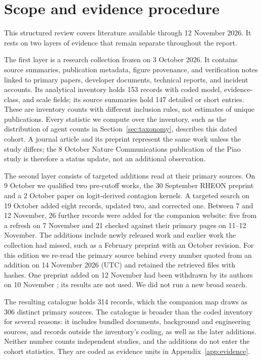 \section{Scope and evidence procedure}
\label{sec:methods}
This structured review covers literature available through 12 November 2026. It rests on two layers of evidence that remain separate throughout the report.

The first layer is a research collection frozen on 3 October 2026. It contains source summaries, publication metadata, figure provenance, and verification notes linked to primary papers, developer documents, technical reports, and incident accounts. Its analytical inventory holds 153 records with coded model, evidence-class, and scale fields; its source summaries hold 147 detailed or short entries. These are inventory counts with different inclusion rules, not estimates of unique publications. Every statistic we compute over the inventory, such as the distribution of agent counts in Section~\ref{sec:taxonomy}, describes this dated cohort. A journal article and its preprint represent the same work unless the study differs; the 8 October Nature Communications publication of the Piao study is therefore a status update, not an additional observation.

The second layer consists of targeted additions read at their primary sources. On 9 October we qualified two pre-cutoff works, the 30 September RHEON preprint and a 2 October paper on logit-derived contagion kernels. A targeted search on 19 October added eight records, updated two, and corrected one. Between 7 and 12 November, 26 further records were added for the companion website: five from a refresh on 7 November and 21 checked against their primary pages on 11--12 November. The additions include newly released work and earlier work the collection had missed, such as a February preprint with an October revision. For this edition we re-read the primary source behind every number quoted from an addition on 14 November 2026 (UTC) and retained the retrieved files with hashes. One preprint added on 12 November had been withdrawn by its authors on 10 November \citep{steering-information-networks}; its results are not used. We did not run a new broad search.

The resulting catalogue holds 314 records, which the companion map draws as 306 distinct primary sources. The catalogue is broader than the coded inventory for several reasons: it includes bundled documents, background and engineering sources, and records outside the inventory's coding, as well as the later additions. Neither number counts independent studies, and the additions do not enter the cohort statistics. They are coded as evidence units in Appendix~\ref{app:evidence}.

